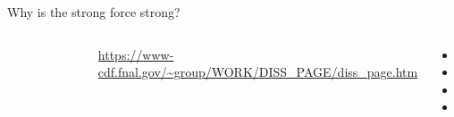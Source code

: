\documentclass[10pt,show notes on second screen]{beamer}
\begin{document}
\begin{frame}{Why is the strong force strong?}
\begin{columns}
    \begin{minipage}[b][0.45\textheight][b]{\linewidth}
    \begin{figure}
        \centering
        \includegraphics[width=0.95\textwidth]{../figures/running_coupling_qed_qcd_png.png}
    \end{figure}
    \tiny{\url{https://www-cdf.fnal.gov/~group/WORK/DISS_PAGE/diss_page.htm}}
    \end{minipage}
    \begin{minipage}[b][0.45\textheight][b]{\linewidth}
        \begin{itemize}
            \item {}
            \item {}
            \item {}
            \item {}
        \end{itemize}
    \end{minipage}

\end{columns}
\end{frame}
\end{document}
